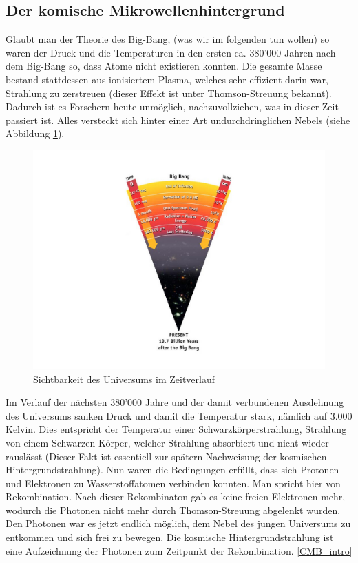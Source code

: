 	\subsection{Der komische Mikrowellenhintergrund}
	Glaubt man der Theorie des Big-Bang, (was wir im folgenden tun wollen) so waren der Druck und die Temperaturen in den ersten ca. 380'000 Jahren nach dem Big-Bang so, dass Atome nicht existieren konnten.
	Die gesamte Masse bestand stattdessen aus ionisiertem Plasma, welches sehr effizient darin war, Strahlung zu zerstreuen (dieser Effekt ist unter Thomson-Streuung bekannt).
	Dadurch ist es Forschern heute unmöglich, nachzuvollziehen, was in dieser Zeit passiert ist.
	Alles versteckt sich hinter einer Art undurchdringlichen Nebels (siehe Abbildung \ref{fig:radiation_scattering}).
	\begin{figure}
		\includegraphics[scale=1]{cmb/images/radiation_scattering.jpg}
		\caption{Sichtbarkeit des Universums im Zeitverlauf}
		\label{fig:radiation_scattering}
	\end{figure}
	Im Verlauf der nächsten 380'000 Jahre und der damit verbundenen Ausdehnung des Universums sanken Druck und damit die Temperatur stark, nämlich auf 3.000 Kelvin.
	Dies entspricht der Temperatur einer Schwarzkörperstrahlung, Strahlung von einem Schwarzen Körper, welcher Strahlung absorbiert und nicht wieder rauslässt (Dieser Fakt ist essentiell zur spätern Nachweisung der kosmischen Hintergrundstrahlung).
	Nun waren die Bedingungen erfüllt, dass sich Protonen und Elektronen zu Wasserstoffatomen verbinden konnten.
	Man spricht hier von Rekombination.
	Nach dieser Rekombinaton gab es keine freien Elektronen mehr, wodurch die Photonen nicht mehr durch Thomson-Streuung abgelenkt wurden.
	Den Photonen war es jetzt endlich möglich, dem Nebel des jungen Universums zu entkommen und sich frei zu bewegen.
	Die kosmische Hintergrundstrahlung ist eine Aufzeichnung der Photonen zum Zeitpunkt der Rekombination.
	\ref{CMB_intro}
	
